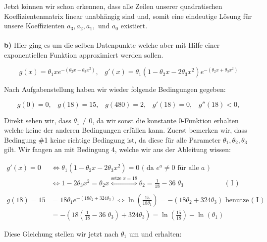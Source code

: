 \documentclass[a4paper]{article}
\begin{document}
Jetzt können wir schon erkennen, dass alle Zeilen unserer quadratischen Koeffizientenmatrix linear unabhängig
sind und, somit eine eindeutige Lösung für unsere Koeffizienten $a_3, a_2, a_1, \text{ und } a_0$ existiert.
\\ \phantom{a} \\

\textbf{b)} Hier ging es um die selben Datenpunkte welche aber mit Hilfe einer exponentiellen Funktion
approximiert werden sollen.

\[
	g(x) = \theta_1 x e ^{-( \theta_2 x + \theta_3 x ^{ 2 } )},\;\;\; 
	g'(x) = \theta_1 \left( 
		1 - \theta_2 x - 2 \theta_3 x ^2
	\right) e ^{-( \theta_2x + \theta_3 x ^2 )}
\] 

Nach Aufgabenstellung haben wir wieder folgende Bedingungen gegeben:

\[
	g(0) = 0, \;\;\;
	g(18) = 15,\;\;\;
	g(480) = 2,\;\;\;
	g'(18) = 0,\;\;\;
	g''(18) < 0,
\] 

Direkt sehen wir, dass $\theta_1 \neq 0$, da wir sonst die konstante 0-Funktion erhalten
welche keine der anderen Bedingungen erfüllen kann.
Zuerst bemerken wir, dass Bedingung \#1 keine richtige Bedingung ist, da diese für alle
Parameter $\theta_1, \theta_2, \theta_3$ gilt. Wir fangen an mit Bedingung 4, welche
wir aus der Ableitung wissen:

\begin{align*}
	g'(x) = 0 &\Leftrightarrow \theta_1 \left( 
		1 - \theta_2 x - 2 \theta_3 x ^2
	\right) = 0 \text{ ( da $e ^{a} \neq 0 $ für alle $a$ )} \\
			   &\Leftrightarrow
		1 - 2 \theta_3 x ^2
	 = \theta_2 x
	 \overset{ \text{setze } x=18 } \Longleftrightarrow
	 \theta_2 = \frac{ 1 }{ 18 } - 36 \; \theta_3 \;\;\;\;\; \qquad \hspace{1cm} \text{ ( I ) }
	 \\ \\
		g(18) = 15 &= 18 \theta_1 e ^{ - (18 \theta_2 + 324 \theta_3) }
		\Leftrightarrow \ln \left( 
			\frac{ 15 }{ 18 \theta_1 }
		\right) = - \left( 
		18 \theta_2 + 324 \theta_3
	\right) \text{ benutze ( I ) } \\
				   &= - \left( 
					   18 \left( 
						   \frac{ 1 }{ 18 } - 36 \; \theta_3
					   \right) 
					   + 324 \theta_3
				   \right) 
				   = \ln \left( \frac{ 15 }{ 18 } \right)  - \ln (\theta_1)
\end{align*}

Diese Gleichung stellen wir jetzt nach $\theta_1$ um und erhalten:
\end{document}
